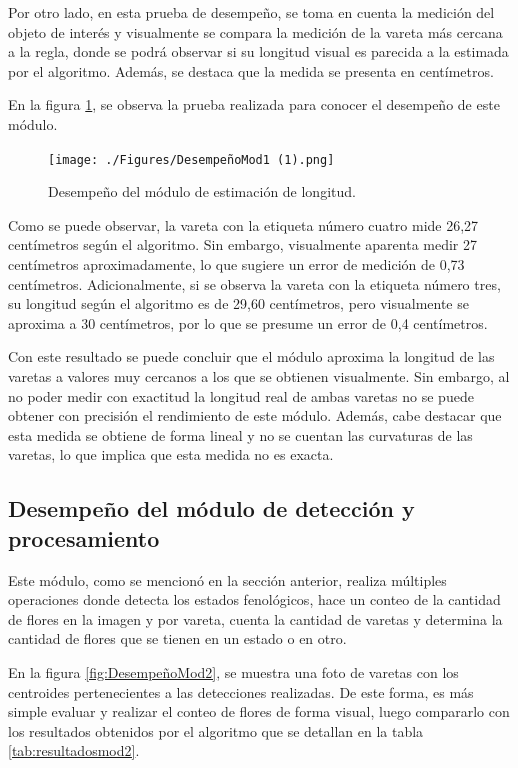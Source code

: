 Por otro lado, en esta prueba de desempeño, se toma en cuenta la medición del objeto de interés y visualmente se compara la medición de la vareta más cercana a la regla, donde se podrá observar si su longitud visual es parecida a la estimada por el algoritmo. Además, se destaca que la medida se presenta en centímetros.

En la figura \ref{fig:DempeñoEstimacionLongitud}, se observa la prueba realizada para conocer el desempeño de este módulo.

\begin{figure}[ht]
	\centering
	\texttt{[image: ./Figures/DesempeñoMod1 (1).png]}
	\caption{Desempeño del módulo de estimación de longitud.}
	\label{fig:DempeñoEstimacionLongitud}
\end{figure}
\newpage

Como se puede observar, la vareta con la etiqueta número cuatro mide 26,27 centímetros según el algoritmo. Sin embargo, visualmente aparenta medir 27 centímetros aproximadamente, lo que sugiere un error de medición de 0,73 centímetros. Adicionalmente, si se observa la vareta con la etiqueta número tres, su longitud según el algoritmo es de 29,60 centímetros, pero visualmente se aproxima a 30 centímetros, por lo que se presume un error de 0,4 centímetros. 

Con este resultado se puede concluir que el módulo aproxima la longitud de las varetas a valores muy cercanos a los que se obtienen visualmente. Sin embargo, al no poder medir con exactitud la longitud real de ambas varetas no se puede obtener con precisión el rendimiento de este módulo. Además, cabe destacar que esta medida se obtiene de forma lineal y no se cuentan las curvaturas de las varetas, lo que implica que esta medida no es exacta.

\subsection{Desempeño del módulo de detección y procesamiento}

Este módulo, como se mencionó en la sección anterior, realiza múltiples operaciones donde detecta los estados fenológicos, hace un conteo de la cantidad de flores en la imagen y por vareta, cuenta la cantidad de varetas y determina la cantidad de flores que se tienen en un estado o en otro.

En la figura \ref{fig:DesempeñoMod2}, se muestra una foto de varetas con los centroides pertenecientes a las detecciones realizadas. De este forma, es más simple evaluar y realizar el conteo de flores de forma visual, luego compararlo con los resultados obtenidos por el algoritmo que se detallan en la tabla \ref{tab:resultadosmod2}.

